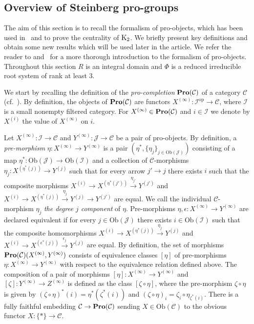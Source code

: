 \documentclass[oneside, 11pt]{amsart} \pdfoutput=1
\begin{document}
\subsection{Overview of Steinberg pro-groups}
The aim of this section is to recall the formalism of pro-objects, which has been used in~\cite{LSV20} and \cite{V20} to prove the centrality of ${\mathrm{K}}_2$. We briefly present key definitions and obtain some new results which will be used later in the article. We refer the reader to \cite[Section~6.1]{SK06} and~\cite[\S~2]{LSV20} for a more thorough introduction to the formalism of pro-objects. Throughout this section $R$ is an integral domain and $\Phi$ is a reduced irreducible root system of rank at least $3$.

We start by recalling the definition of the {\it pro-completion} ${\normalfont\textbf{Pro}}(\mathcal{C})$ of a category $\mathcal{C}$ (cf.~\cite[\S~2.1]{LSV20}).
By definition, the objects of ${\normalfont\textbf{Pro}}(\mathcal{C})$ are functors $X^{(\infty)}\colon\mathcal{I}^{\mathrm{op}} \to \mathcal{C}$, where $\mathcal{I}$ is a small nonempty filtered category. For $X^{(\infty)} \in 
{\normalfont\textbf{Pro}}(\mathcal{C})$ and $i \in \mathcal{I}$ we denote by $X^{(i)}$ the value of $X^{(\infty)}$ on $i$. 

Let $X^{(\infty)}\colon\mathcal{I}\to\mathcal{C}$ and $Y^{(\infty)}\colon\mathcal{J}\to\mathcal{C}$ be a pair of pro-objects.
By definition, a {\it pre-morphism} $\eta\colon X^{(\infty)} \to Y^{(\infty)}$ is a pair $(\eta^*, \{\eta_j\}_{j\in\mathrm{Ob}(\mathcal{J})})$ consisting of a map $\eta^*\colon \mathrm{Ob}(\mathcal{J})\to\mathrm{Ob}(\mathcal{I})$ and a collection of $\mathcal{C}$-morphisms $\eta_j\colon X^{(\eta^*(j))}\to Y^{(j)}$ such that for every arrow $j' \to j$ there exists $i$ such that the composite morphisms $X^{(i)} \to X^{(\eta^*(j'))} \xrightarrow{\eta_{j'}} Y^{(j')}$ and $X^{(i)} \to X^{(\eta^*(j))} \xrightarrow{\eta_j} Y^{(j)} \to Y^{(j')}$ are equal. We call the individual $\mathcal{C}$-morphism $\eta_j$ {\it the degree $j$ component} of $\eta$.
Pre-morphisms $\eta, \epsilon \colon X^{(\infty)} \to Y^{(\infty)}$ are declared equivalent if for every $j \in \mathrm{Ob}(\mathcal{J})$ there exists $i \in \mathrm{Ob}(\mathcal{I})$ such that the composite homomorphisms $X^{(i)} \to X^{(\eta^*(j))} \xrightarrow{\eta_j} Y^{(j)}$ and $X^{(i)} \to X^{(\epsilon^*(j))} \xrightarrow{\epsilon_j} Y^{(j)}$ are equal. By definition, the set of morphisms ${\normalfont\textbf{Pro}}(\mathcal{C})(X^{(\infty)}, Y^{(\infty)})$ consists of equivalence classes $[\eta]$ of pre-morphisms $\eta \colon X^{(\infty)} \to Y^{(\infty)}$ with respect to the equivalence relation defined above. The composition of a pair of morphisms \([\eta] \colon X^{(\infty)} \to Y^{(\infty)}\) and \([\zeta] \colon Y^{(\infty)} \to Z^{(\infty)}\) is defined as the class $[\zeta \circ \eta]$, where the pre-morphism \(\zeta \circ \eta\) is given by \((\zeta \circ \eta)^*(i) = \eta^*(\zeta^*(i))\) and \((\zeta\circ \eta)_{i} = \zeta_{i} \circ \eta_{\zeta^*(i)}\). There is a fully faithful embedding $\mathcal{C}\to{\normalfont\textbf{Pro}}(\mathcal{C})$ sending $X \in \mathrm{Ob}(\mathcal{C})$ to the obvious functor $X\colon \{ * \} \to \mathcal{C}$. 
\end{document}
